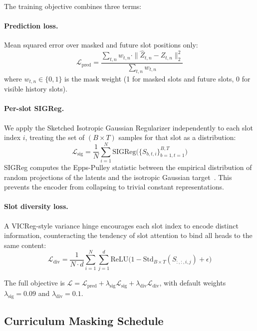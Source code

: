 \documentclass[12pt]{article}
\begin{document}
The training objective combines three terms:

\paragraph{Prediction loss.} Mean squared error over masked and future slot positions only:
\begin{equation}
\mathcal{L}_{\text{pred}} = \frac{\sum_{t,n} w_{t,n} \cdot \|\hat{Z}_{t,n} - Z_{t,n}\|_2^2}{\sum_{t,n} w_{t,n}}
\end{equation}
where $w_{t,n} \in \{0,1\}$ is the mask weight (1 for masked slots and future slots, 0 for visible history slots).

\paragraph{Per-slot SIGReg.} We apply the Sketched Isotropic Gaussian Regularizer independently to each slot index $i$, treating the set of $(B \times T)$ samples for that slot as a distribution:
\begin{equation}
\mathcal{L}_{\text{sig}} = \frac{1}{N}\sum_{i=1}^{N} \text{SIGReg}\big(\{S_{b,t,i}\}_{b=1,t=1}^{B,T}\big)
\end{equation}
SIGReg computes the Epps-Pulley statistic between the empirical distribution of random projections of the latents and the isotropic Gaussian target~\citep{maes2026lewm}. This prevents the encoder from collapsing to trivial constant representations.

\paragraph{Slot diversity loss.} A VICReg-style variance hinge encourages each slot index to encode distinct information, counteracting the tendency of slot attention to bind all heads to the same content:
\begin{equation}
\mathcal{L}_{\text{div}} = \frac{1}{N \cdot d} \sum_{i=1}^{N} \sum_{j=1}^{d} \text{ReLU}\big(1 - \text{Std}_{B \times T}(S_{:,:,i,j}) + \epsilon\big)
\end{equation}

The full objective is $\mathcal{L} = \mathcal{L}_{\text{pred}} + \lambda_{\text{sig}}\mathcal{L}_{\text{sig}} + \lambda_{\text{div}}\mathcal{L}_{\text{div}}$, with default weights $\lambda_{\text{sig}} = 0.09$ and $\lambda_{\text{div}} = 0.1$.

\subsection{Curriculum Masking Schedule}
\end{document}

